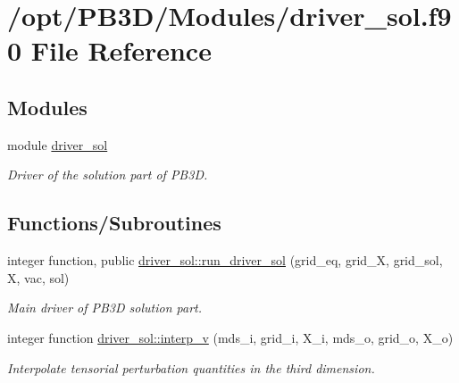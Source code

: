 \hypertarget{driver__sol_8f90}{}\section{/opt/\+P\+B3\+D/\+Modules/driver\+\_\+sol.f90 File Reference}
\label{driver__sol_8f90}
\subsection*{Modules}
\begin{DoxyCompactItemize}
\item 
module \hyperlink{namespacedriver__sol}{driver\+\_\+sol}
\begin{DoxyCompactList}\small\item\em Driver of the solution part of P\+B3D. \end{DoxyCompactList}\end{DoxyCompactItemize}
\subsection*{Functions/\+Subroutines}
\begin{DoxyCompactItemize}
\item 
integer function, public \hyperlink{namespacedriver__sol_ad3b1765b3ecc5f82129bfc683ffc6c5c}{driver\+\_\+sol\+::run\+\_\+driver\+\_\+sol} (grid\+\_\+eq, grid\+\_\+X, grid\+\_\+sol, X, vac, sol)
\begin{DoxyCompactList}\small\item\em Main driver of P\+B3D solution part. \end{DoxyCompactList}\item 
integer function \hyperlink{namespacedriver__sol_af1c4ea0286ad714d3f91bb1608e4fc27}{driver\+\_\+sol\+::interp\+\_\+v} (mds\+\_\+i, grid\+\_\+i, X\+\_\+i, mds\+\_\+o, grid\+\_\+o, X\+\_\+o)
\begin{DoxyCompactList}\small\item\em Interpolate tensorial perturbation quantities in the third dimension. \end{DoxyCompactList}\end{DoxyCompactItemize}
